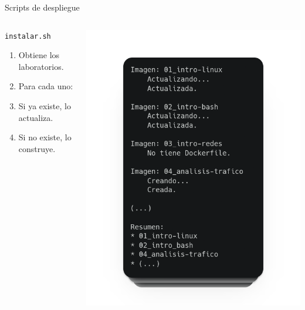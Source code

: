     \begin{frame}{Scripts de despliegue}
        \begin{columns}[c]
                \begin{block}{\texttt{instalar.sh}}
                    \begin{enumerate}
                        \item Obtiene los laboratorios.
                        \item Para cada uno:
                        \item Si ya existe, lo actualiza.
                        \item Si no existe, lo construye.
                    \end{enumerate}
                \end{block}
            
                \includegraphics[scale=0.2]{images/capturas/instalar.png}
        \end{columns}
    \end{frame}

